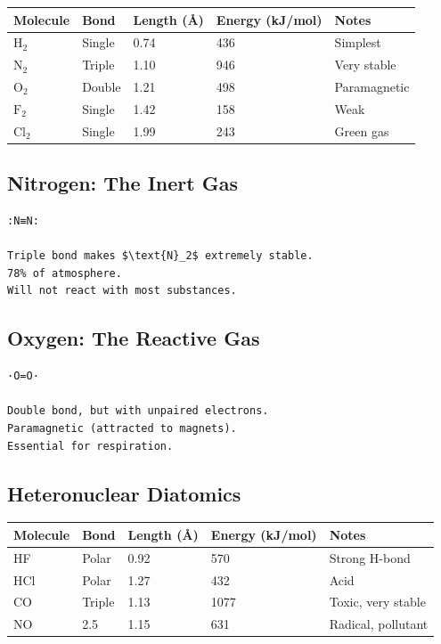 \documentclass[
  11pt,
  letterpaper,
  twoside,
  openright]{book}
\begin{document}
\begin{longtable}[]{@{}lllll@{}}
\toprule\noalign{}
Molecule & Bond & Length (Å) & Energy (kJ/mol) & Notes \\
\midrule\noalign{}
\endhead
\bottomrule\noalign{}
\endlastfoot
\(\text{H}_2\) & Single & 0.74 & 436 & Simplest \\
\(\text{N}_2\) & Triple & 1.10 & 946 & Very stable \\
\(\text{O}_2\) & Double & 1.21 & 498 & Paramagnetic \\
\(\text{F}_2\) & Single & 1.42 & 158 & Weak \\
\(\text{Cl}_2\) & Single & 1.99 & 243 & Green gas \\
\end{longtable}

\subsection{Nitrogen: The Inert Gas}\label{nitrogen-the-inert-gas}

\begin{verbatim}
:N≡N:

Triple bond makes $\text{N}_2$ extremely stable.
78% of atmosphere.
Will not react with most substances.
\end{verbatim}

\subsection{Oxygen: The Reactive Gas}\label{oxygen-the-reactive-gas}

\begin{verbatim}
·O=O·

Double bond, but with unpaired electrons.
Paramagnetic (attracted to magnets).
Essential for respiration.
\end{verbatim}

\subsection{Heteronuclear Diatomics}\label{heteronuclear-diatomics}

\begin{longtable}[]{@{}lllll@{}}
\toprule\noalign{}
Molecule & Bond & Length (Å) & Energy (kJ/mol) & Notes \\
\midrule\noalign{}
\endhead
\bottomrule\noalign{}
\endlastfoot
HF & Polar & 0.92 & 570 & Strong H-bond \\
HCl & Polar & 1.27 & 432 & Acid \\
CO & Triple & 1.13 & 1077 & Toxic, very stable \\
NO & 2.5 & 1.15 & 631 & Radical, pollutant \\
\end{longtable}
\end{document}
